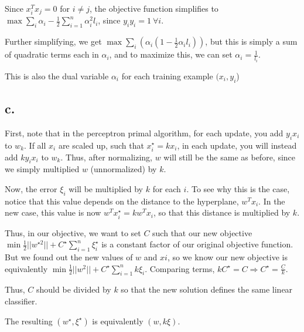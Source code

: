 \documentclass[]{article}
\begin{document}
Since $x_i^Tx_j = 0$ for $i \neq j$, the objective function simplifies to $\max \sum_i \alpha_i - \frac{1}{2}\sum_{i=1}^n \alpha_i^2 l_i$, since $y_iy_i = 1~\forall i$.

Further simplifying, we get $\max \sum_i \left( \alpha_i (1-\frac{1}{2}\alpha_i l_i)\right)$, but this is simply a sum of quadratic terms each in $\alpha_i$, and to maximize this, we can set $\alpha_i = \frac{1}{l_i}$.

This is also the dual variable $\alpha_i$ for each training example $(x_i, y_i$)

\subsection{c.}
First, note that in the perceptron primal algorithm, for each update, you add $y_i x_i$ to $w_k$. If all $x_i$ are scaled up, such that $x_i^\star = kx_i$, in each update, you will instead add $ky_ix_i$ to $w_k$. Thus, after normalizing, $w$ will still be the same as before, since we simply multiplied $w$ (unnormalized) by $k$.

Now, the error $\xi_i$ will be multiplied by $k$ for each $i$. To see why this is the case, notice that this value depends on the distance to the hyperplane, $w^Tx_i$. In the new case, this value is now $w^Tx_i^\star = kw^Tx_i$, so that this distance is multiplied by $k$.

Thus, in our objective, we want to set $C$ such that our new objective $\min \frac{1}{2}||w^{\star 2}|| + C^\star \sum_{i=1}^n \xi_i^\star$ is a constant factor of our original objective function.
But we found out the new values of $w$ and $xi$, so we know our new objective is equivalently $\min \frac{1}{2}||w^2|| + C^\star \sum_{i=1}^n k\xi_i$. Comparing terms, $kC^\star = C \Rightarrow C^\star = \frac{C}{k}$.

Thus, $C$ should be divided by $k$ so that the new solution defines the same linear classifier.

The resulting $(w^\star, \xi^\star)$ is equivalently $(w, k\xi)$. 
\end{document}
